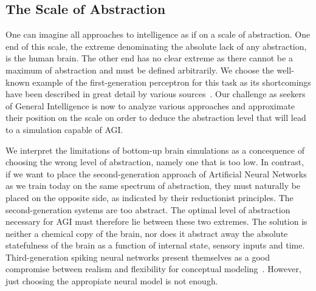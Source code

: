 \subsection{The Scale of Abstraction}
One can imagine all approaches to intelligence as if on a scale of abstraction.
One end of this scale, the extreme denominating the absolute lack of any abstraction, is the human brain.
The other end has no clear extreme as there cannot be a maximum of abstraction and must 
be defined arbitrarily. We choose the well-known example of the first-generation perceptron for this task as its
shortcomings have been described in great detail by various sources~\cite{Anderson1995}.
Our challenge as seekers of General Intelligence is now to analyze various approaches and approximate their position on
the scale on order to deduce the abstraction level that will lead to a simulation capable of AGI\@.

We interpret the limitations of bottom-up brain simulations as a concequence of choosing the wrong level of abstraction, 
namely one that is too low. In contrast, if we want to place the second-generation approach of 
Artificial Neural Networks as we train today on the same spectrum of abstraction, they must naturally be placed on the 
opposite side, as indicated by their reductionist principles. The second-generation systems are too abstract.
The optimal level of abstraction necessary for AGI must therefore lie between these two extremes. 
The solution is neither a chemical copy of the brain, nor does it abstract 
away the absolute statefulness of the brain as a function of internal state, sensory inputs and time.
Third-generation spiking neural networks present themselves as a good compromise between
realism and flexibility for conceptual modeling~\cite{Paugam-Moisy2012}. However, just choosing the appropiate
neural model is not enough. 

